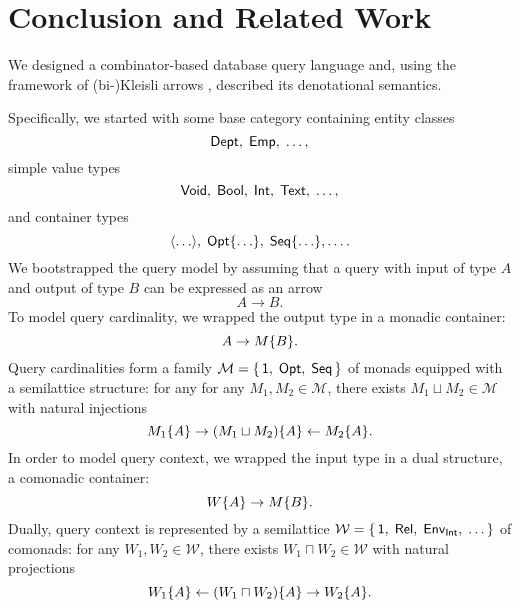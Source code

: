 
\section{Conclusion and Related Work}
\label{sec:conclusion}

We designed a combinator-based database query language and, using the
framework of (bi-)Kleisli arrows \cite{Moggi1991, Uustalu2006}, described its
denotational semantics.

Specifically, we started with some base category containing entity classes
\begin{equation*}
    \mathsf{Dept},\; \mathsf{Emp},\; \ldots,
\end{equation*}
simple value types
\begin{equation*}
    \mathsf{Void},\; \mathsf{Bool},\; \mathsf{Int},\; \mathsf{Text},\; \ldots,
\end{equation*}
and container types
\begin{equation*}
    \langle \ldots \rangle,\; \mathsf{Opt}{\left\{\ldots\right\}},\; \mathsf{Seq}{\left\{\ldots\right\}}, \ldots.
\end{equation*}
We bootstrapped the query model by assuming that a query with input of type $A$
and output of type $B$ can be expressed as an arrow
\begin{equation*}
    A \to B.
\end{equation*}
To model query cardinality, we wrapped the output type in a monadic container:
\begin{equation*}
    A \to M{\left\{B\right\}}.
\end{equation*}
Query cardinalities form a family
$\mathcal{M}=\{\,\mathsf{1},\;\mathsf{Opt},\;\mathsf{Seq}\,\}$ of monads
equipped with a semilattice structure: for any
for any $M_1, M_2 \in \mathcal{M}$, there exists
$M_1 \sqcup M_2 \in \mathcal{M}$ with natural injections
\begin{equation*}
    M_1{\left\{A\right\}} \rightarrow (M_1 \sqcup M_2){\left\{A\right\}} \leftarrow M_2{\left\{A\right\}}.
\end{equation*}
In order to model query context, we wrapped the input type in a dual structure,
a comonadic container:
\begin{equation*}
    W{\left\{A\right\}} \to M{\left\{B\right\}}.
\end{equation*}
Dually, query context is represented by a semilattice
$\mathcal{W}=\{\,\mathsf{1},\;\mathsf{Rel},\;\mathsf{Env}_{\mathsf{Int}},\;\ldots\,\}$
of comonads: for any $W_1, W_2 \in \mathcal{W}$, there exists
$W_1 \sqcap W_2 \in \mathcal{W}$ with natural projections
\begin{equation*}
    W_1{\left\{A\right\}} \leftarrow (W_1 \sqcap W_2)\{A\} \rightarrow W_2{\left\{A\right\}}.
\end{equation*}
